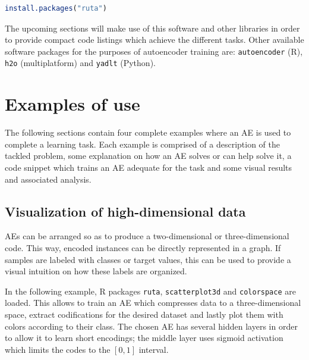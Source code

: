 \begin{lstlisting}[language=R]
install.packages("ruta")
\end{lstlisting}

The upcoming sections will make use of this software and other libraries in order to provide compact code listings which achieve the different tasks. %
Other available software packages for the purposes of autoencoder training are: \texttt{autoencoder} (R), \texttt{h2o} (multiplatform) and \texttt{yadlt} (Python).

\section{Examples of use}
\label{p4sec.examples}

The following sections contain four complete examples where an AE is used to complete a learning task. Each example is comprised of a description of the tackled problem, some explanation on how an AE solves or can help solve it, a code snippet which trains an AE adequate for the task and some visual results and associated analysis.

\subsection{Visualization of high-dimensional data} %
\label{p4sec.visualization}

AEs can be arranged so as to produce a two-dimensional or three-dimensional code. This way, encoded instances can be directly represented in a graph. If samples are labeled with classes or target values, this can be used to provide a visual intuition on how these labels are organized. 

In the following example, R packages \texttt{ruta}, \texttt{scatterplot3d} and \texttt{colorspace} are loaded. This allows to train an AE which compresses data to a three-dimensional space, extract codifications for the desired dataset and lastly plot them with colors according to their class. The chosen AE has several hidden layers in order to allow it to learn short encodings; the middle layer uses sigmoid activation which limits the codes to the $[0,1]$ interval.

